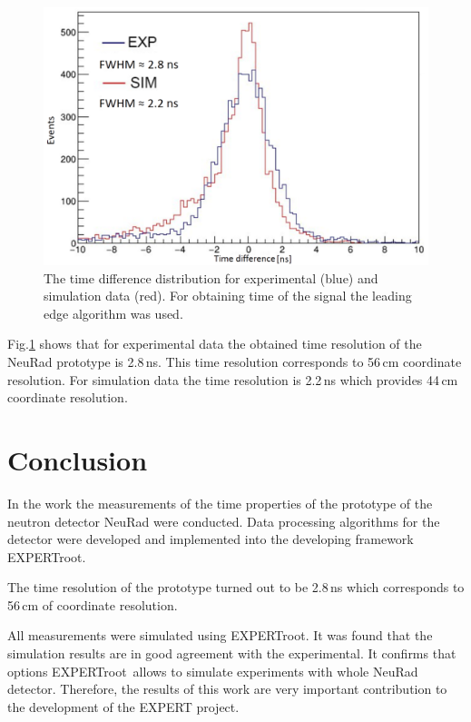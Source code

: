 \documentclass{webofc}
\newcommand{\er}{\textmd{EXPERTroot}}
\begin{document}
\begin{figure}[h]
	\centering
	\includegraphics[width=0.8\linewidth]{tausim.png}
	\caption{The time difference distribution for experimental (blue) and simulation data (red). For obtaining time of the signal the leading edge algorithm was used.}\label{ris:tausim}
\end{figure}

Fig.\ref{ris:tausim} shows that for experimental data the obtained time resolution of the NeuRad prototype is 2.8\,ns. This time resolution corresponds to 56\,cm coordinate resolution. For simulation data the time resolution is 2.2\,ns which provides 44\,cm coordinate resolution.  



\section{Conclusion}

In the work the measurements of the time properties of the prototype of the neutron detector NeuRad were conducted.
Data processing algorithms for the detector were developed and implemented into the developing framework \er.

The time resolution of the prototype turned out to be 2.8\,ns which corresponds to 56\,cm of coordinate resolution.

All measurements were simulated using \er. It was found that the simulation results are in good agreement with the experimental. It confirms that options \er\, allows to simulate experiments with whole NeuRad detector.
Therefore, the results of this work are very important contribution to the development of the EXPERT project.
\end{document}
